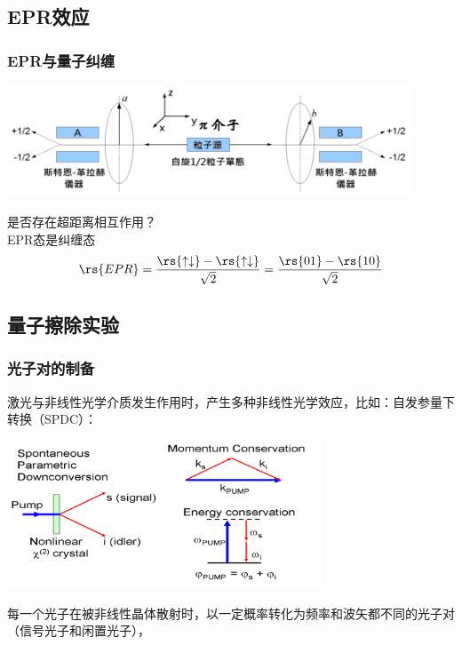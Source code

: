 \subsection{EPR效应}

\begin{frame} 
    \frametitle{EPR与量子纠缠}
    \begin{center}
        \includegraphics[width=0.9\textwidth]{figs/28.png}
    \end{center}
    {\Bullet} 是否存在超距离相互作用？\\
    {\Bullet} EPR态是纠缠态\[\rs{EPR}=\frac{\rs{\uparrow \downarrow }-\rs{\uparrow \downarrow }}{\sqrt{2}} = \frac{\rs{01 }-\rs{10 }}{\sqrt{2}} \]
\end{frame} 

\subsection{量子擦除实验}

\begin{frame}
    \frametitle{光子对的制备}
    激光与非线性光学介质发生作用时，产生多种非线性光学效应，比如：自发参量下转换（SPDC）： 
    \begin{center}
        \includegraphics[width=0.7\textwidth]{figs/31.png}
    \end{center}
    每一个光子在被非线性晶体散射时，以一定概率转化为频率和波矢都不同的光子对（信号光子和闲置光子），
\end{frame}

